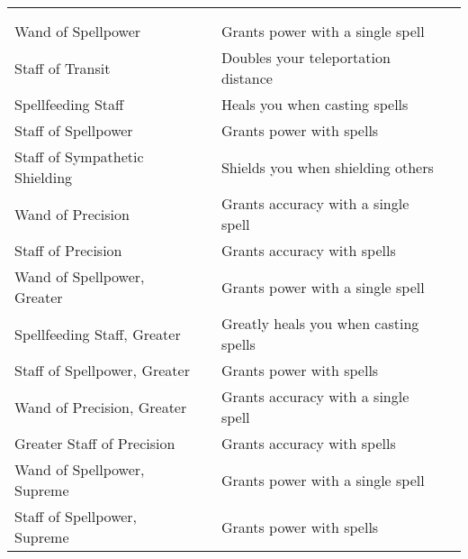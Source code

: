 
\begin{longtabuwrapper}
\begin{longtabu}{l l X l}
 \\
 &  &  &  \\
\bottomrule
Wand of Spellpower &  & Grants  power with a single spell & \pageref{item:Wand of Spellpower} \\
Staff of Transit &  & Doubles your teleportation distance & \pageref{item:Staff of Transit} \\
Spellfeeding Staff &  & Heals you when casting spells & \pageref{item:Spellfeeding Staff} \\
Staff of Spellpower &  & Grants  power with spells & \pageref{item:Staff of Spellpower} \\
Staff of Sympathetic Shielding &  & Shields you when shielding others & \pageref{item:Staff of Sympathetic Shielding} \\
Wand of Precision &  & Grants  accuracy with a single spell & \pageref{item:Wand of Precision} \\
Staff of Precision &  & Grants  accuracy with spells & \pageref{item:Staff of Precision} \\
Wand of Spellpower, Greater &  & Grants  power with a single spell & \pageref{item:Wand of Spellpower, Greater} \\
Spellfeeding Staff, Greater &  & Greatly heals you when casting spells & \pageref{item:Spellfeeding Staff, Greater} \\
Staff of Spellpower, Greater &  & Grants  power with spells & \pageref{item:Staff of Spellpower, Greater} \\
Wand of Precision, Greater &  & Grants  accuracy with a single spell & \pageref{item:Wand of Precision, Greater} \\
Greater Staff of Precision &  & Grants  accuracy with spells & \pageref{item:Greater Staff of Precision} \\
Wand of Spellpower, Supreme &  & Grants  power with a single spell & \pageref{item:Wand of Spellpower, Supreme} \\
Staff of Spellpower, Supreme &  & Grants  power with spells & \pageref{item:Staff of Spellpower, Supreme} \\
\end{longtabu}
\end{longtabuwrapper}
